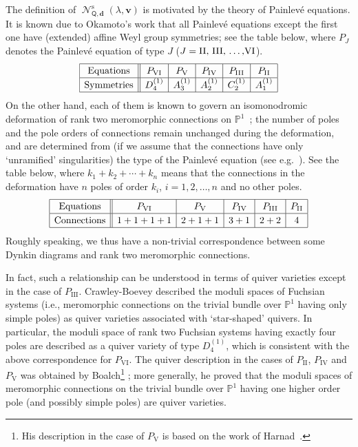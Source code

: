 \documentclass[pdftex]{sigma}
\numberwithin{equation}{section}
\theoremstyle{definition}
\newcommand{\bbP}{\mathbb{P}} %
\newcommand{\bv}{\mathbf{v}}
\newcommand{\ved}{\mathbf{d}}
\newcommand{\Qst}{\operatorname{\mathscr{N}}^\mathrm{s}}
\newcommand{\QQ}{\mathsf{Q}} %
\begin{document}
The def\/inition of $\Qst_{\QQ,\ved}(\lambda,\bv)$
is motivated by the theory of Painlev\'e equations.
It is known due to Okamoto's work
\cite{MR854008,MR916698,MR914314,MR927186} that
all Painlev\'e equations except the f\/irst one
have (extended) af\/f\/ine Weyl group symmetries;
see the table below, where $P_J$ denotes the Painlev\'e equation
of type $J$ ($J=\text{II, III, \dots ,VI}$).
\[
\hfill
{\renewcommand{\arraystretch}{1.2}
\begin{array}{|c||c|c|c|c|c|}
\hline
\text{Equations} & P_\mathrm{VI} & P_\mathrm{V} & P_\mathrm{IV} & P_\mathrm{III} & P_\mathrm{II}
\\ \hline
\text{Symmetries} & D_4^{(1)} & A_3^{(1)} & A_2^{(1)} & C_2^{(1)} & A_1^{(1)}
\\ \hline
\end{array}}
\hfill
\]
On the other hand, each of them is known to
govern an isomonodromic deformation
of rank two meromorphic connections on $\bbP^1$~\cite{MR625446};
the number of poles and the pole orders of connections remain
unchanged during the deformation, and are determined from
(if we assume that the connections have only `unramif\/ied' singularities)
the type of the Painlev\'e equation (see e.g.\ \cite{0902.1702}).
See the table below, where $k_1 + k_2 + \cdots + k_n$
means that the connections in the deformation
have $n$ poles of order $k_i$, $i=1,2, \dots ,n$ and no other poles.
\[
\hfill
{\renewcommand{\arraystretch}{1.2}
\begin{array}{|c||c|c|c|c|c|}
\hline
\text{Equations} & P_\mathrm{VI} & P_\mathrm{V} & P_\mathrm{IV} & P_\mathrm{III} & P_\mathrm{II}
\\ \hline
\text{Connections} & 1+1+1+1 & 2+1+1 & 3+1 & 2+2 & 4
\\ \hline
\end{array}}
\hfill
\]
Roughly speaking, we thus have a non-trivial correspondence
between some Dynkin diagrams and
rank two meromorphic connections.

In fact, such a relationship can be understood in terms of quiver varieties
except in the case of $P_\mathrm{III}$.
Crawley-Boevey \cite{MR1980997} described
the moduli spaces of Fuchsian systems
(i.e., meromorphic connections on the trivial bundle over $\bbP^1$
having only simple poles)
as quiver varieties associated with `star-shaped' quivers.
In particular, the moduli space of rank two Fuchsian systems
having exactly four poles are
described as a quiver variety of type $D_4^{(1)}$,
which is consistent with the above correspondence for $P_\mathrm{VI}$.
The quiver description in the cases of $P_\mathrm{II}$, $P_\mathrm{IV}$
and $P_\mathrm{V}$ was obtained by Boalch\footnote{His description in the case of $P_\mathrm{V}$
is based on the work of Harnad~\cite{MR1309553}.} \cite{0806.1050};
more generally, he proved that the moduli spaces of meromorphic connections
on the trivial bundle over $\bbP^1$
having one higher order pole (and possibly simple poles)
are quiver varieties.
\end{document}
